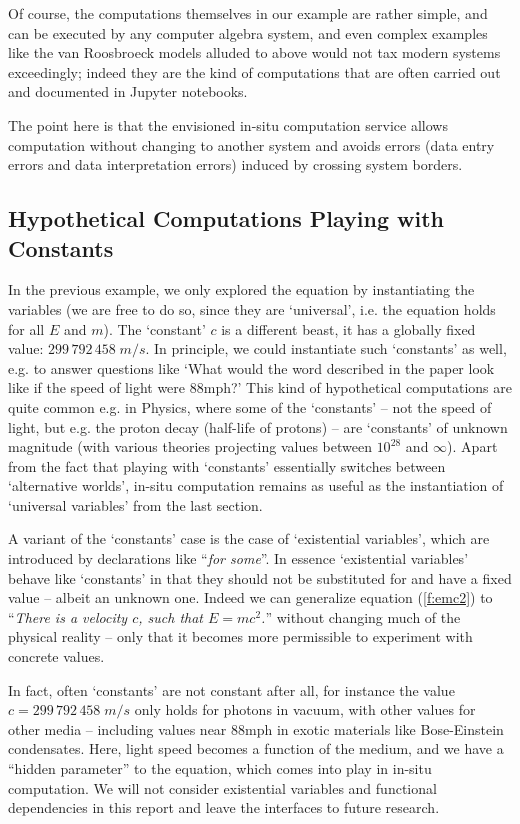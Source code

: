Of course, the computations themselves in our example are rather simple, and can be
executed by any computer algebra system, and even complex examples like the van Roosbroeck
models alluded to above would not tax modern systems exceedingly; indeed they are the kind
of computations that are often carried out and documented in Jupyter notebooks.

The point here is that the envisioned in-situ computation service allows computation
without changing to another system and avoids errors (data entry errors and data
interpretation errors) induced by crossing system borders.

\subsection{Hypothetical Computations Playing with Constants}\label{sec:ex:hyp}

In the previous example, we only explored the equation by instantiating the variables (we
are free to do so, since they are `universal', i.e. the equation holds for all $E$ and
$m$). The `constant' $c$ is a different beast, it has a globally fixed value:
$299\, 792\, 458\;m/s$. In principle, we could instantiate such `constants' as well,
e.g. to answer questions like `What would the word described in the paper look like
if the speed of light were $88 \text{mph}$?' This kind of hypothetical computations are
quite common e.g. in Physics, where some of the `constants' -- not the speed of light,
but e.g. the proton decay (half-life of protons) -- are `constants' of unknown
magnitude (with various theories projecting values between $10^{28}$ and $\infty$). Apart
from the fact that playing with `constants' essentially switches between `alternative
worlds', in-situ computation remains as useful as the instantiation of `universal
variables' from the last section.

A variant of the `constants' case is the case of `existential variables', which are
introduced by declarations like ``\emph{for some}''. In essence `existential variables'
behave like `constants' in that they should not be substituted for and have a fixed value
-- albeit an unknown one. Indeed we can generalize equation (\ref{f:emc2}) to
``\emph{There is a velocity $c$, such that $E=mc^2$.}'' without changing much of the
physical reality -- only that it becomes more permissible to experiment with concrete
values.

In fact, often `constants' are not constant after all, for instance the value
$c=299\, 792\, 458\;m/s$ only holds for photons in vacuum, with other values for other
media -- including values near $88\text{mph}$ in exotic materials like Bose-Einstein
condensates. Here, light speed becomes a function of the medium, and we have a ``hidden
parameter'' to the equation, which comes into play in in-situ computation. We will not
consider existential variables and functional dependencies in this report and leave the
interfaces to future research.


